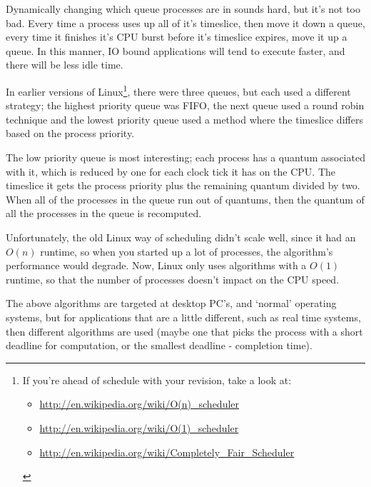 \begin{description}
    Dynamically changing which queue processes are in sounds hard, but it's not
    too bad. Every time a process uses up all of it's timeslice, then move it
    down a queue, every time it finishes it's CPU burst before it's timeslice
    expires, move it up a queue. In this manner, IO bound applications will tend
    to execute faster, and there will be less idle time. 

    In earlier versions of Linux\footnote{
      If you're ahead of schedule with your revision, take a look at:
      \begin{itemize}
        \item \url{http://en.wikipedia.org/wiki/O(n)_scheduler}
        \item \url{http://en.wikipedia.org/wiki/O(1)_scheduler}
        \item \url{http://en.wikipedia.org/wiki/Completely_Fair_Scheduler}
      \end{itemize}
    }, there were three queues, but each used a
    different strategy; the highest priority queue was FIFO, the next queue used
    a round robin technique and the lowest priority queue used a method where
    the timeslice differs based on the process priority.

    The low priority queue is most interesting; each process has a quantum
    associated with it, which is reduced by one for each clock tick it has on
    the CPU. The timeslice it gets the process priority plus the remaining
    quantum divided by two. When all of the processes in the queue run out of
    quantums, then the quantum of all the processes in the queue is recomputed.

    Unfortunately, the old Linux way of scheduling didn't scale well, since it
    had an $O(n)$ runtime, so when you started up a lot of processes, the
    algorithm's performance would degrade. Now, Linux only uses algorithms with
    a $O(1)$ runtime, so that the number of processes doesn't impact on the CPU
    speed.

\end{description}

The above algorithms are targeted at desktop PC's, and `normal' operating
systems, but for applications that are a little different, such as real time
systems, then different algorithms are used (maybe one that picks the process
with a short deadline for computation, or the smallest deadline - completion
time).

